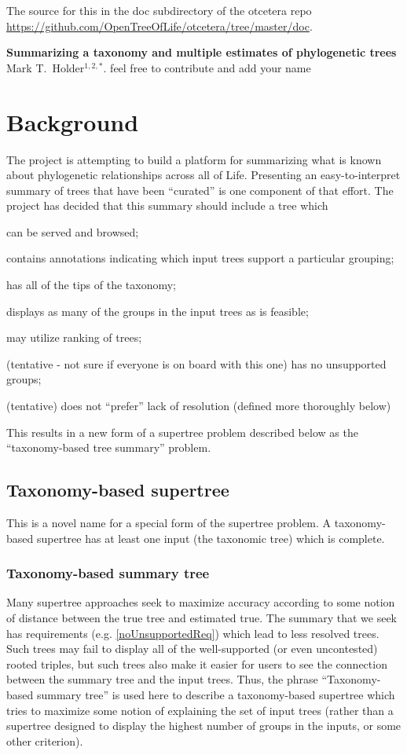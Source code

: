 \documentclass[11pt]{article}
\begin{document}
The source for this in the doc subdirectory of the otcetera
    repo \url{https://github.com/OpenTreeOfLife/otcetera/tree/master/doc}.
\begin{center}
    {\bf Summarizing a taxonomy and multiple estimates of phylogenetic trees} \\
{Mark T.~Holder$^{1,2,\ast}$. feel free to contribute and add your name}
\end{center}
\tableofcontents
\section{Background}
The \otol project is attempting to build a platform for summarizing what is known
    about phylogenetic relationships across all of Life.
Presenting an easy-to-interpret summary of trees that have been ``curated''
    is one component of that effort.
The project has decided that this summary should include a tree which
\begin{compactenum}
    \item can be served and browsed;
    \item contains annotations indicating which input trees support a particular grouping;
    \item has all of the tips of the taxonomy;
    \item displays as many of the groups in the input trees as is feasible;
    \item may utilize ranking of trees;
    \item (tentative - not sure if everyone is on board with this one) has no unsupported groups;\label{noUnsupportedReq}
    \item (tentative) does not ``prefer'' lack of resolution (defined more thoroughly below)
\end{compactenum}
This results in a new form of a supertree problem described below as the ``taxonomy-based tree summary'' problem.
\subsection{Taxonomy-based supertree}
This is a novel name for a special form of the supertree problem.
A taxonomy-based supertree has at least one input (the taxonomic tree) which is complete.
\subsubsection{Taxonomy-based summary tree}
Many supertree approaches seek to maximize accuracy according to some notion
    of distance between the true tree and estimated true.
The summary that we seek has requirements (e.g. \ref{noUnsupportedReq})
    which lead to less resolved trees.
Such trees may fail to display all of the well-supported (or even uncontested)
    rooted triples, but such trees also make it easier for users to see the
    connection between the summary tree and the input trees.
Thus, the phrase ``Taxonomy-based summary tree'' is used here to describe a
    taxonomy-based supertree which tries to maximize some notion of
    explaining the set of input trees (rather than a supertree designed to
    display the highest number of groups in the inputs, or some other criterion).
\end{document}
